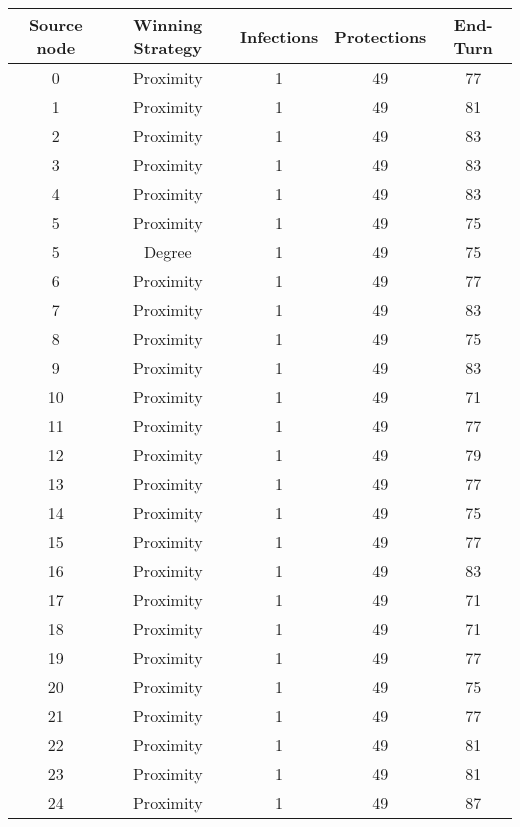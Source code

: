 \documentclass[results.tex]{subfiles}
\begin{document}
\begin{center}
  \begin{tabular}{| c || c | c | c | c |}
    \hline
    {\bfseries Source node} & {\bfseries Winning Strategy} & {\bfseries Infections} & {\bfseries Protections} & {\bfseries End-Turn} \\  %
    \hline\hline
    0 & Proximity & 1 & 49 & 77 \\ 
    \hline
    1 & Proximity & 1 & 49 & 81 \\ 
    \hline
    2 & Proximity & 1 & 49 & 83 \\ 
    \hline
    3 & Proximity & 1 & 49 & 83 \\ 
    \hline
    4 & Proximity & 1 & 49 & 83 \\ 
    \hline
    5 & Proximity & 1 & 49 & 75 \\ 
    \hline
    5 & Degree & 1 & 49 & 75 \\ 
    \hline
    6 & Proximity & 1 & 49 & 77 \\ 
    \hline
    7 & Proximity & 1 & 49 & 83 \\ 
    \hline
    8 & Proximity & 1 & 49 & 75 \\ 
    \hline
    9 & Proximity & 1 & 49 & 83 \\ 
    \hline
    10 & Proximity & 1 & 49 & 71 \\ 
    \hline
    11 & Proximity & 1 & 49 & 77 \\ 
    \hline
    12 & Proximity & 1 & 49 & 79 \\ 
    \hline
    13 & Proximity & 1 & 49 & 77 \\ 
    \hline
    14 & Proximity & 1 & 49 & 75 \\ 
    \hline
    15 & Proximity & 1 & 49 & 77 \\ 
    \hline
    16 & Proximity & 1 & 49 & 83 \\ 
    \hline
    17 & Proximity & 1 & 49 & 71 \\ 
    \hline
    18 & Proximity & 1 & 49 & 71 \\ 
    \hline
    19 & Proximity & 1 & 49 & 77 \\ 
    \hline
    20 & Proximity & 1 & 49 & 75 \\ 
    \hline
    21 & Proximity & 1 & 49 & 77 \\ 
    \hline
    22 & Proximity & 1 & 49 & 81 \\ 
    \hline
    23 & Proximity & 1 & 49 & 81 \\ 
    \hline
    24 & Proximity & 1 & 49 & 87 \\ 

\end{tabular}
\end{center}
\end{document}
